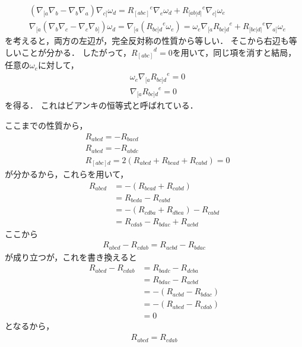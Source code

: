 \documentclass[a4paper]{jsarticle}
\begin{document}
\begin{enumerate}
		\begin{align}
			&\left( \nabla_{[a} \nabla_b - \nabla_b \nabla_a \right) \nabla_{c]} \omega_d
			= {R_{[abc]}}^e \nabla_e \omega_d + {R_{[ab|d|}}^e \nabla_{c]} \omega_e \\
			&\nabla_{[a} \left( \nabla_b \nabla_c - \nabla_c \nabla_{b]} \right) \omega_d
			= \nabla_{[a} \left( {R_{bc]d}}^e \omega_e \right)
			= \omega_e \nabla_{[a} {R_{bc]d}}^e + {R_{[bc|d|}}^e \nabla_{a]} \omega_e
		\end{align}
		を考えると，両方の左辺が，完全反対称の性質から等しい．
		そこから右辺も等しいことが分かる．
		したがって，${R_{[abc]}}^d = 0$を用いて，同じ項を消すと結局，
		任意の$\omega_e$に対して，
		\begin{align}
			&\omega_e \nabla_{[a} {R_{bc]d}}^e = 0 \\
			&\nabla_{[a} {R_{bc]d}}^e = 0
		\end{align}
		を得る．
		これはビアンキの恒等式と呼ばれている．
\end{enumerate}
ここまでの性質から，
\begin{align}
	&R_{abcd} = -R_{bacd} \\
	&R_{abcd} = -R_{abdc} \\
	&R_{[abc]d} = 2( R_{abcd} + R_{bcad} + R_{cabd}) = 0
\end{align}
が分かるから，これらを用いて，
\begin{align}
	R_{abcd}
	&= -( R_{bcad} + R_{cabd}) \\
	&= R_{bcda} - R_{cabd} \\
	&= -(R_{cdba} + R_{dbca}) - R_{cabd} \\
	&= R_{cdab} - R_{bdac} + R_{acbd}
\end{align}
ここから
\begin{align}
	R_{abcd} - R_{cdab}  = R_{acbd} - R_{bdac}
\end{align}
が成り立つが，これを書き換えると
\begin{align}
	R_{abcd} - R_{cdab}
	&= R_{badc} - R_{dcba} \\
	&= R_{bdac} - R_{acbd} \\
	&= -( R_{acbd} - R_{bdac}) \\
	&= -( R_{abcd} - R_{cdab}) \\
	&= 0
\end{align}
となるから，
\begin{align}
	R_{abcd} = R_{cdab}
\end{align}
\end{document}
